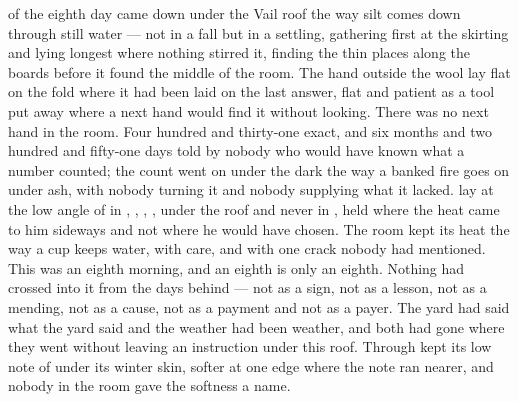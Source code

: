 
 of the eighth day came down under the Vail roof the way silt comes down through still water --- not in a fall but in a settling, gathering first at the skirting and lying longest where nothing stirred it, finding the thin places along the boards before it found the middle of the room. The hand outside the wool lay flat on the fold where it had been laid on the last answer, flat and patient as a tool put away where a next hand would find it without looking. There was no next hand in the room. Four hundred and thirty-one exact, and six months and two hundred and fifty-one days told by nobody who would have known what a number counted; the count went on under the dark the way a banked fire goes on under ash, with nobody turning it and nobody supplying what it lacked.  lay at the low angle of  in , , , , under the roof and never in , held where the heat came to him sideways and not where he would have chosen. The room kept its heat the way a cup keeps water, with care, and with one crack nobody had mentioned. This was an eighth morning, and an eighth is only an eighth. Nothing had crossed into it from the days behind --- not as a sign, not as a lesson, not as a mending, not as a cause, not as a payment and not as a payer. The yard had said what the yard said and the weather had been weather, and both had gone where they went without leaving an instruction under this roof. Through   kept its low note of  under its winter skin, softer at one edge where the note ran nearer, and nobody in the room gave the softness a name.

